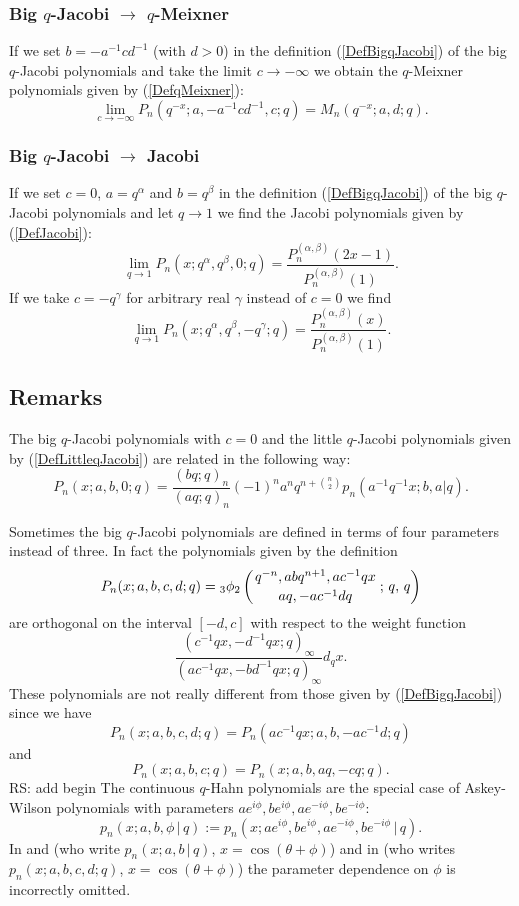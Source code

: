 \documentclass[envcountchap,graybox]{svmono}
\newcounter{rom}
\newcommand{\qhyp}[5]{\mbox{}_{#1}{\phi}_{#2}
\left(\genfrac{}{}{0pt}{}{#3}{#4}\,;\,q,\,#5\right)}
\newcommand\tha\theta
\newcommand{\qhyp}[5]{\,\mbox{}_{#1}\phi_{#2}\!\left(
  \genfrac{}{}{0pt}{}{#3}{#4};#5\right)}
\begin{document}
\subsubsection*{Big $q$-Jacobi $\rightarrow$ $q$-Meixner}
If we set $b=-a^{-1}cd^{-1}$ (with $d>0$) in the definition (\ref{DefBigqJacobi})
of the big $q$-Jacobi polynomials and take the limit $c\rightarrow -\infty$ we
obtain the $q$-Meixner polynomials given by (\ref{DefqMeixner}):
\begin{equation}
\lim_{c\rightarrow -\infty}P_n(q^{-x};a,-a^{-1}cd^{-1},c;q)=M_n(q^{-x};a,d;q).
\end{equation}

\subsubsection*{Big $q$-Jacobi $\rightarrow$ Jacobi}
If we set $c=0$, $a=q^{\alpha}$ and $b=q^{\beta}$ in the definition (\ref{DefBigqJacobi})
of the big $q$-Jacobi polynomials and let $q\rightarrow 1$ we find the Jacobi
polynomials given by (\ref{DefJacobi}):
\begin{equation}
\lim_{q\rightarrow 1}P_n(x;q^{\alpha},q^{\beta},0;q)=\frac{P_n^{(\alpha,\beta)}(2x-1)}{P_n^{(\alpha,\beta)}(1)}.
\end{equation}
If we take $c=-q^{\gamma}$ for arbitrary real $\gamma$ instead of $c=0$ we
find
\begin{equation}
\lim_{q\rightarrow 1}P_n(x;q^{\alpha},q^{\beta},-q^{\gamma};q)=\frac{P_n^{(\alpha,\beta)}(x)}{P_n^{(\alpha,\beta)}(1)}.
\end{equation}

\subsection*{Remarks} 
The big $q$-Jacobi polynomials with $c=0$ and the little
$q$-Jacobi polynomials given by (\ref{DefLittleqJacobi}) are related
in the following way:
$$P_n(x;a,b,0;q)=\frac{(bq;q)_n}{(aq;q)_n}(-1)^na^nq^{n+\binom{n}{2}}p_n(a^{-1}q^{-1}x;b,a|q).$$

\noindent
Sometimes the big $q$-Jacobi polynomials are defined in terms of four
parameters instead of three. In fact the polynomials given by the definition
$$P_n(x;a,b,c,d;q)=\qhyp{3}{2}{q^{-n},abq^{n+1},ac^{-1}qx}{aq,-ac^{-1}dq}{q}$$
are orthogonal on the interval $[-d,c]$ with respect to the weight function
$$\frac{(c^{-1}qx,-d^{-1}qx;q)_{\infty}}{(ac^{-1}qx,-bd^{-1}qx;q)_{\infty}}d_qx.$$
These polynomials are not really different from those given by
(\ref{DefBigqJacobi}) since we have
$$P_n(x;a,b,c,d;q)=P_n(ac^{-1}qx;a,b,-ac^{-1}d;q)$$
and
$$P_n(x;a,b,c;q)=P_n(x;a,b,aq,-cq;q).$$
 RS: add begin\label{sec14.4}
The continuous $q$-Hahn polynomials are the special case
of Askey-Wilson polynomials with parameters
$a e^{i\phi},b e^{i\phi},a e^{-i\phi},b e^{-i\phi}$:
\[
p_n(x;a,b,\phi\,|\, q):=
p_n(x;a e^{i\phi},b e^{i\phi},a e^{-i\phi},b e^{-i\phi}\,|\, q).
\]
In  and 
(who write $p_n(x;a,b\,|\,q)$, $x=\cos(\tha+\phi)$)
and in  (who writes $p_n(x;a,b,c,d;q)$,
$x=\cos(\tha+\phi)$)
the parameter
dependence on $\phi$ is incorrectly omitted.
\end{document}

